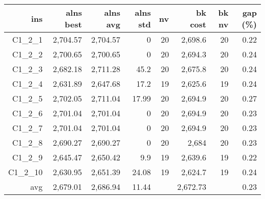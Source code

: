  \begin{table}[caption={Kết quả đo với tập HG\_C\_1\_2 200 yêu cầu}, label=exp:HGC12]
      \centering
      \begin{tabular}{rrrrrrrr}
        \hline
        ins & alns best & alns avg & alns std & nv & bk cost & bk nv & gap (\%) \\ \hline
        C1\_2\_1 & 2,704.57 & 2,704.57 & 0 & 20 & 2,698.6 & 20 & 0.22 \\ \hline
        C1\_2\_2 & 2,700.65 & 2,700.65 & 0 & 20 & 2,694.3 & 20 & 0.24 \\ \hline
        C1\_2\_3 & 2,682.18 & 2,711.28 & 45.2 & 20 & 2,675.8 & 20 & 0.24 \\ \hline
        C1\_2\_4 & 2,631.89 & 2,647.68 & 17.2 & 19 & 2,625.6 & 19 & 0.24 \\ \hline
        C1\_2\_5 & 2,702.05 & 2,711.04 & 17.99 & 20 & 2,694.9 & 20 & 0.27 \\ \hline
        C1\_2\_6 & 2,701.04 & 2,701.04 & 0 & 20 & 2,694.9 & 20 & 0.23 \\ \hline
        C1\_2\_7 & 2,701.04 & 2,701.04 & 0 & 20 & 2,694.9 & 20 & 0.23 \\ \hline
        C1\_2\_8 & 2,690.27 & 2,690.27 & 0 & 20 & 2,684 & 20 & 0.23 \\ \hline
        C1\_2\_9 & 2,645.47 & 2,650.42 & 9.9 & 19 & 2,639.6 & 19 & 0.22 \\ \hline
        C1\_2\_10 & 2,630.95 & 2,651.39 & 24.08 & 19 & 2,624.7 & 19 & 0.24 \\ \hline
        avg & 2,679.01 & 2,686.94 & 11.44 & & 2,672.73 & & 0.23 \\ \hline
      \end{tabular}
  \end{table}
    
